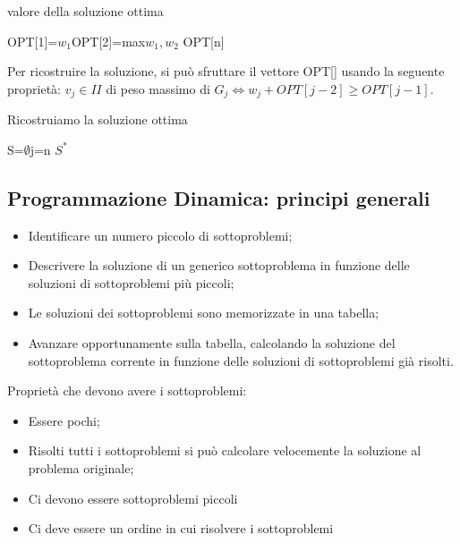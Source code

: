 \documentclass{article}
\begin{document}
\begin{center}
\begin{algorithm}
\caption{valore della soluzione ottima}
OPT[1]=$w_1$\;OPT[2]=max{$w_1,w_2$}\;
\Return OPT[n]\;
\end{algorithm}
\end{center}
Per ricostruire la soluzione, si può sfruttare il vettore OPT[] usando la seguente proprietà:
$v_j \in II$ di peso massimo di $G_j \Leftrightarrow w_j + OPT[j-2] \geq OPT[j-1]$.
\begin{center}
\begin{algorithm}
\caption{Ricostruiamo la soluzione ottima}
S=$\emptyset$\;j=n\;
\Return $S^*$\;
\end{algorithm}
\end{center}
\subsection{Programmazione Dinamica: principi generali}
\begin{itemize}
    \item Identificare un numero piccolo di sottoproblemi;
    \item Descrivere la soluzione di un generico sottoproblema in funzione delle soluzioni di sottoproblemi più piccoli;
    \item Le soluzioni dei sottoproblemi sono memorizzate in una tabella;
    \item Avanzare opportunamente sulla tabella, calcolando la soluzione del sottoproblema corrente in funzione delle soluzioni di sottoproblemi già risolti.
\end{itemize}
Proprietà che devono avere i sottoproblemi:
\begin{itemize}
    \item Essere pochi;
    \item Risolti tutti i sottoproblemi si può calcolare velocemente la soluzione al problema originale;
    \item Ci devono essere sottoproblemi piccoli
    \item Ci deve essere un ordine in cui risolvere i sottoproblemi
\end{itemize}
\end{document}
